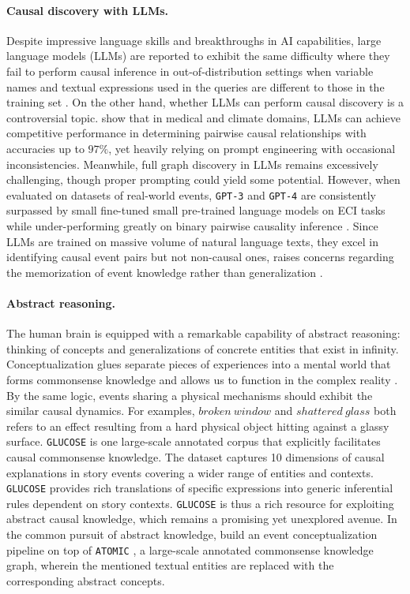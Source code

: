  
\paragraph{Causal discovery with LLMs.} Despite impressive language skills and breakthroughs in AI capabilities, large language models (LLMs) are reported to exhibit the same difficulty where they fail to perform causal inference in out-of-distribution settings when variable names and textual expressions used in the queries are different to those in the training set \citep{jin2023can,zevcevic2023causal}. On the other hand, whether LLMs can perform causal discovery is a controversial topic. \citet{kiciman2023causal} show that in medical and climate domains, LLMs can achieve competitive performance in determining pairwise causal relationships with accuracies up to $97\%$, yet heavily relying on prompt engineering with occasional inconsistencies. Meanwhile, full graph discovery in LLMs remains excessively challenging, though proper prompting could yield some potential. However, when evaluated on datasets of real-world events, \texttt{GPT-3} and \texttt{GPT-4} are consistently surpassed by small fine-tuned small pre-trained language models on ECI tasks \citep{gao2019modeling} while under-performing greatly on binary pairwise causality inference \citep{romanou2023crab}. Since LLMs are trained on massive volume of natural language texts, they excel in identifying causal event pairs but not non-causal ones, raises concerns regarding the memorization of event knowledge rather than generalization \citep{jacovi2023stop,gao2023chatgpt,romanou2023crab}. 

\paragraph{Abstract reasoning.} The human brain is equipped with a remarkable capability of abstract reasoning: thinking of concepts and generalizations of concrete entities that exist in infinity. Conceptualization glues separate pieces of experiences into a mental world that forms commonsense knowledge and allows us to function in the complex reality \cite{murphy2004big}. By the same logic, events sharing a physical mechanisms should exhibit the similar causal dynamics. For examples, $broken \ window$ and $shattered \ glass$ both refers to an effect resulting from a hard physical object hitting against a glassy surface. \texttt{GLUCOSE} \cite{mostafazadeh-etal-2020-glucose} is one large-scale annotated corpus that explicitly facilitates causal commonsense knowledge. The dataset captures 10 dimensions of causal explanations in story events covering a wider range of entities and contexts. \texttt{GLUCOSE} provides rich translations of specific expressions into generic inferential rules dependent on story contexts. \texttt{GLUCOSE} is thus a rich resource for exploiting abstract causal knowledge, which remains a promising yet unexplored avenue. In the common pursuit of abstract knowledge, \citet{he2022acquiring} build an event conceptualization pipeline on top of \texttt{ATOMIC} \cite{sap2019atomic}, a large-scale annotated commonsense knowledge graph, wherein the mentioned textual entities are replaced with the corresponding abstract concepts.